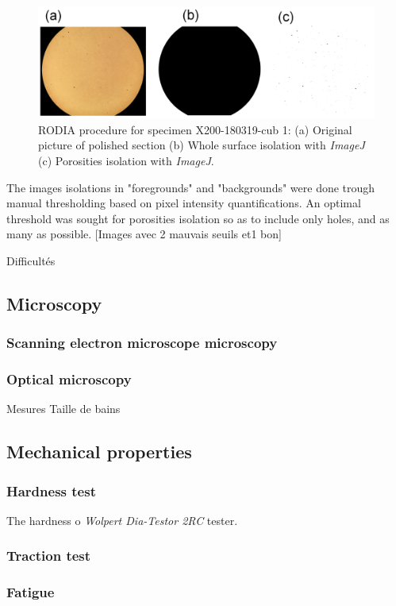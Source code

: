 \begin{figure}[th]
\centering
\centerline{\includegraphics[scale=0.29]{Images/ImageJ-cub1}}
\decoRule
\caption[RODIA procedure for specimen X200-180319-cub 1: (a) Original picture of polished section (b) Whole surface isolation with \textit{ImageJ} (c) Porosities isolation with \textit{ImageJ}.]{RODIA procedure for specimen X200-180319-cub 1: (a) Original picture of polished section (b) Whole surface isolation with \textit{ImageJ} (c) Porosities isolation with \textit{ImageJ}.}
\label{fig:ImageJ}
\end{figure}

The images isolations in "foregrounds" and "backgrounds" were done trough manual thresholding based on pixel intensity quantifications.  %
An optimal threshold was sought for porosities isolation so as to include only holes, and as many as possible. [Images avec 2 mauvais seuils et1 bon]

Difficultés  
\subsection{Microscopy}

\subsubsection{Scanning electron microscope microscopy}

\subsubsection{Optical microscopy}
Mesures Taille de bains
\subsection{Mechanical properties}

\subsubsection{Hardness test}

The hardness o  \textit{Wolpert Dia-Testor 2RC} tester.

\subsubsection{Traction test}

\subsubsection{Fatigue}
